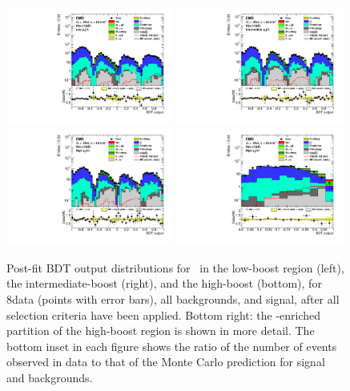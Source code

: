 \documentclass[12pt,twoside,a4paper,cmspaper,final,collab]{cms-tdr}
\begin{document}
\begin{figure}[htbp]
\centering
\includegraphics[width=0.49\textwidth]{BDT_Wln_ch1_Wenu_PostFit_s.pdf}
\includegraphics[width=0.49\textwidth]{BDT_Wln_ch1_Wenu2_PostFit_s.pdf}
\includegraphics[width=0.49\textwidth]{BDT_Wln_ch1_Wenu3_PostFit_s.pdf}
\includegraphics[width=0.49\textwidth]{BDT_Wln_Last_ch1_Wenu3_PostFit_s.pdf}
   \caption{Post-fit BDT output distributions for \WenH\ in the
    low-boost region (left),  the intermediate-boost (right), and the
    high-boost  (bottom), for 8\TeV data (points with error bars),
    all backgrounds, and signal, after all selection criteria have been
    applied.  Bottom right: the \VH-enriched partition of the high-boost region
    is shown in more detail. The bottom inset in each
      figure shows the ratio of the number of events observed in data to that
      of the Monte Carlo prediction for signal and backgrounds.}
    \label{fig:BDTWln8TeV_e}
\end{figure}
\end{document}

